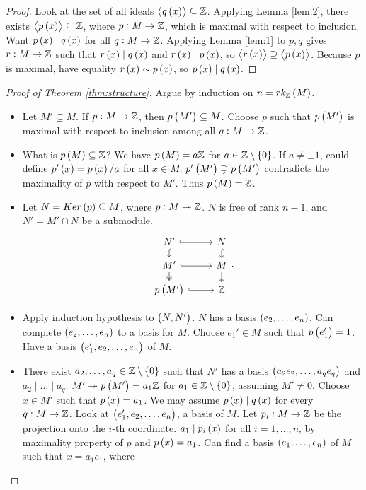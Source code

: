 \pagebreak

\begin{proof}
Look at the set of all ideals $ \abr{q\br{x}} \subseteq \Z $. Applying Lemma \ref{lem:2}, there exists $ \abr{p\br{x}} \subseteq \Z $, where $ p : M \to \mathbb{Z} $, which is maximal with respect to inclusion. Want $ p\br{x} \mid q\br{x} $ for all $ q : M \to \mathbb{Z} $. Applying Lemma \ref{lem:1} to $ p, q $ gives $ r : M \to \mathbb{Z} $ such that $ r\br{x} \mid q\br{x} $ and $ r\br{x} \mid p\br{x} $, so $ \abr{r\br{x}} \supseteq \abr{p\br{x}} $. Because $ p $ is maximal, have equality $ r\br{x} \sim p\br{x} $, so $ p\br{x} \mid q\br{x} $.
\end{proof}

\begin{proof}[Proof of Theorem \ref{thm:structure}]
Argue by induction on $ n = rk_\Z\br{M} $.
\begin{itemize}
\item Let $ M' \subseteq M $. If $ p : M \to \mathbb{Z} $, then $ p\br{M'} \subseteq M $. Choose $ p $ such that $ p\br{M'} $ is maximal with respect to inclusion among all $ q : M \to \mathbb{Z} $.
\item What is $ p\br{M} \subseteq \Z $? We have $ p\br{M} = a\Z $ for $ a \in \Z \setminus \cbr{0} $. If $ a \ne \pm 1 $, could define $ p'\br{x} = p\br{x} / a $ for all $ x \in M $. $ p'\br{M'} \supsetneq p\br{M'} $ contradicts the maximality of $ p $ with respect to $ M' $. Thus $ p\br{M} = \Z $.
\item Let $ N = Ker\br{p} \subseteq M $, where $ p : M \twoheadrightarrow \mathbb{Z} $. $ N $ is free of rank $ n - 1 $, and $ N' = M' \cap N $ be a submodule.
$$
\begin{tikzcd}[row sep=small]
N' \arrow[hookrightarrow]{r} \arrow[hookrightarrow]{d} & N \arrow[hookrightarrow]{d} \\
M' \arrow[hookrightarrow]{r} \arrow[twoheadrightarrow]{d} & M \arrow[twoheadrightarrow]{d} \\
p\br{M'} \arrow[hookrightarrow]{r} & \Z
\end{tikzcd}.
$$
\item Apply induction hypothesis to $ \br{N, N'} $. $ N $ has a basis $ \br{e_2, \dots, e_n} $. Can complete $ \br{e_2, \dots, e_n} $ to a basis for $ M $. Choose $ e_1' \in M $ such that $ p\br{e_1'} = 1 $. Have a basis $ \br{e_1', e_2, \dots, e_n} $ of $ M $.
\item There exist $ a_2, \dots, a_q \in \Z \setminus \cbr{0} $ such that $ N' $ has a basis $ \br{a_2e_2, \dots, a_qe_q} $ and $ a_2 \mid \dots \mid a_q $. $ M' \twoheadrightarrow p\br{M'} = a_1\Z $ for $ a_1 \in \Z \setminus \cbr{0} $, assuming $ M' \ne 0 $. Choose $ x \in M' $ such that $ p\br{x} = a_1 $. We may assume $ p\br{x} \mid q\br{x} $ for every $ q : M \to \mathbb{Z} $. Look at $ \br{e_1', e_2, \dots, e_n} $, a basis of $ M $. Let $ p_i : M \to \mathbb{Z} $ be the projection onto the $ i $-th coordinate. $ a_1 \mid p_i\br{x} $ for all $ i = 1, \dots, n $, by maximality property of $ p $ and $ p\br{x} = a_1 $. Can find a basis $ \br{e_1, \dots, e_n} $ of $ M $ such that $ x = a_1e_1 $, where

\end{itemize}
\end{proof}
